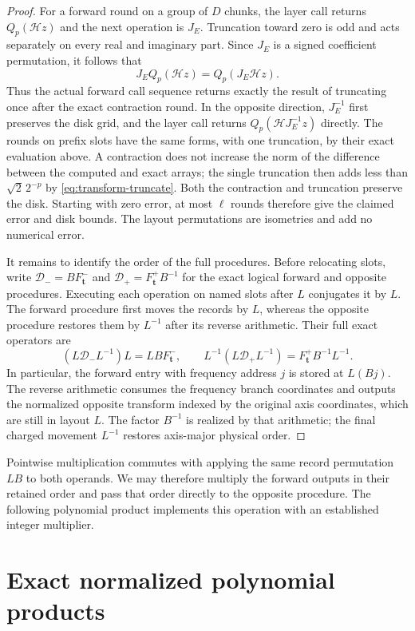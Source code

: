 \documentclass[11pt]{article}
\theoremstyle{definition}
\begin{document}
\begin{proof}
For a forward round on a group of $D$ chunks, the layer call returns
$Q_p(\mathcal H z)$ and the next operation is $J_E$.  Truncation
toward zero is odd and acts separately on every real and imaginary
part.  Since $J_E$ is a signed coefficient permutation, it follows
that
\[
       J_EQ_p(\mathcal H z)=Q_p(J_E\mathcal H z).
\]
Thus the actual forward call sequence returns exactly the result of
truncating once after the exact contraction round.  In the opposite
direction, $J_E^{-1}$
first preserves the disk grid, and the layer call returns
$Q_p(\mathcal HJ_E^{-1}z)$ directly.  The rounds on prefix slots
have the same forms, with one truncation, by their exact evaluation
above.  A contraction does not increase the norm of the difference
between the computed and exact arrays; the single truncation then
adds less than $\sqrt2\,2^{-p}$ by \eqref{eq:transform-truncate}.
Both the contraction and truncation preserve the disk.  Starting with
zero error, at most $\ell$ rounds therefore
give the claimed error and disk bounds.  The layout permutations
are isometries and add no numerical error.

It remains to identify the order of the full procedures.  Before
relocating slots, write
$\mathcal D_-=BF_{\boldsymbol t}^-$ and
$\mathcal D_+=F_{\boldsymbol t}^+B^{-1}$ for the exact logical forward and
opposite procedures.  Executing each operation on named slots after $L$
conjugates it by $L$.  The forward procedure first moves the records
by $L$, whereas the opposite procedure restores them by $L^{-1}$
after its reverse arithmetic.  Their full exact operators are
\[
 (L\mathcal D_-L^{-1})L=LB F_{\boldsymbol t}^-,
 \qquad
 L^{-1}(L\mathcal D_+L^{-1})
       =F_{\boldsymbol t}^+B^{-1}L^{-1}.
\]
In particular, the forward entry with frequency address $j$ is
stored at $L(Bj)$.  The reverse arithmetic consumes the frequency
branch coordinates and outputs the normalized opposite transform
indexed by the original axis coordinates, which are still in layout $L$.
The factor $B^{-1}$ is realized by that arithmetic; the final
charged movement $L^{-1}$ restores axis-major physical order.
\end{proof}

Pointwise multiplication commutes with applying the same record
permutation $LB$ to both operands.  We may therefore multiply the
forward outputs in their retained order and pass that order directly
to the opposite procedure.  The following polynomial product
implements this operation with an established integer multiplier.

\section{Exact normalized polynomial products}
\label{sec:exact-ring-products}
\end{document}
